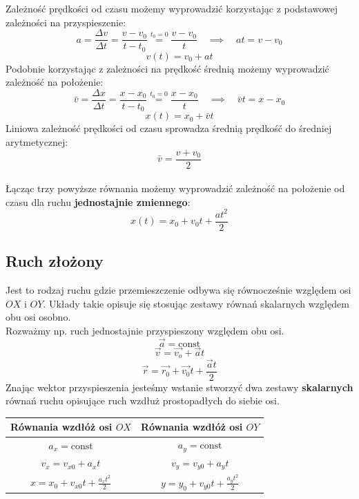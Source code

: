 \documentclass[a4paper]{article}
\begin{document}
        \noindent Zależność prędkości od czasu możemy wyprowadzić korzystając z podstawowej zależności na przyspieszenie:
        \[a = \frac{\Delta v}{\Delta t} = \frac{v - v_0}{t - t_0} \overset{t_0 = 0}{=} \frac{v - v_0}{t} \quad\implies\quad at = v - v_0\]
        \[v(t) = v_0 + at\]
        Podobnie korzystając z zależności na prędkość średnią możemy wyprowadzić zależność na położenie:
        \[\bar{v} = \frac{\Delta x}{\Delta t} = \frac{x - x_0}{t - t_0} \overset{t_0 = 0}{=} \frac{x - x_0}{t} \quad\implies\quad \bar{v}t = x - x_0\]
        \[x(t) = x_0 + \bar{v}t\]
        Liniowa zależność prędkości od czasu sprowadza średnią prędkość do średniej arytmetycznej:
        \[\bar{v} = \frac{v + v_0}{2}\]
        \\
        Łącząc trzy powyższe równania możemy wyprowadzić zależność na położenie od czasu dla ruchu \textbf{jednostajnie zmiennego}:
        \[x(t) = x_0 + v_0t + \frac{at^2}{2}\]
        
    \subsection{\LARGE Ruch złożony}
        \Large
        Jest to rodzaj ruchu gdzie przemieszczenie odbywa się równocześnie względem osi $OX$ i $OY$.
        Układy takie opisuje się stosując zestawy równań skalarnych względem obu osi osobno.\\ 
        Rozważmy np. ruch jednostajnie przyspieszony względem obu osi.
        \[ \vec{a} = \text{const}\] 
        \[ \vec{v} = \vec{v_o} + \vec{a}t \]
        \[ \vec{r} = \vec{r_0} + \vec{v_0}t + \frac{\vec{a}t}{2}\]
        Znając wektor przyspieszenia jesteśmy wstanie stworzyć dwa zestawy \textbf{skalarnych} równań ruchu opisujące
        ruch wzdłuż prostopadłych do siebie osi.\\
        \begin{center}
            \begin{tabular}{ |c|c| } 
                \hline
                Równania wzdłóż osi $OX$ & Równania wzdłóż osi $OY$ \\ 
                \hline
                $a_x = \text{const}$ & $a_y = \text{const}$  \\ 
                $v_x = v_{x0} + a_xt$ & $v_y = v_{y0} + a_yt$  \\ 
                $x = x_0 + v_{x0}t + \frac{a_xt^2}{2}$ & $y = y_0 + v_{y0}t + \frac{a_yt^2}{2}$  \\ 
                \hline
            \end{tabular}
        \end{center}  
    \pagebreak
\end{document}
